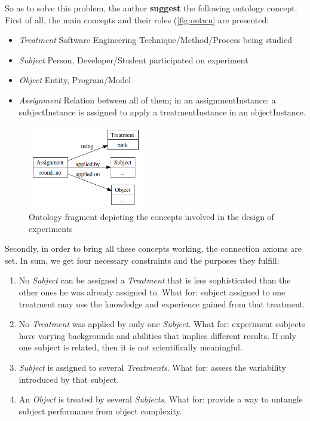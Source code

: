 	So as to solve this problem, the author \textbf{suggest} the following ontology concept. First of all, the main concepts and their roles (\autoref{fig:ontwu} are presented: 
	\begin{itemize}
		\item{\textit{Treatment}} Software Engineering Technique/Method/Process being studied
		\item{\textit{Subject}} Person, Developer/Student participated on experiment
		\item{\textit{Object}} Entity, Program/Model
		\item{\textit{Assignment}} Relation between all of them; in an assignmentInstance: a subjectInstance is assigned to apply a treatmentInstance in an objectInstance. 
	\end{itemize}
	\begin{figure}
		\centering
		\includegraphics[width=5cm]{images/OntWu.PNG}
		\caption{Ontology fragment depicting the concepts involved in the design of experiments\cite[p. 13]{SiyWu12}}
		\label{fig:ontwu}
	\end{figure} 
	Secondly, in order to bring all these concepts working, the connection axioms are set. In sum, we get four necessary constraints and the purposes they fulfill:
	\begin{enumerate}
		\item No \textit{Subject} can be assigned a \textit{Treatment} that is less sophisticated than the other ones he was already assigned to. What for: subject assigned to one treatment may use the knowledge and experience
		gained from that treatment.
		\item No \textit{Treatment} was applied by only one \textit{Subject}. What for: experiment subjects have varying backgrounds and abilities that implies different results. If only one subject is related, then it is not scientifically meaningful.
		\item \textit{Subject} is assigned to several \textit{Treatments}. What for: assess the variability introduced by that subject.
		\item An \textit{Object} is treated by several \textit{Subjects}. What for: provide a way to untangle subject performance from object complexity.
	\end{enumerate}
	
